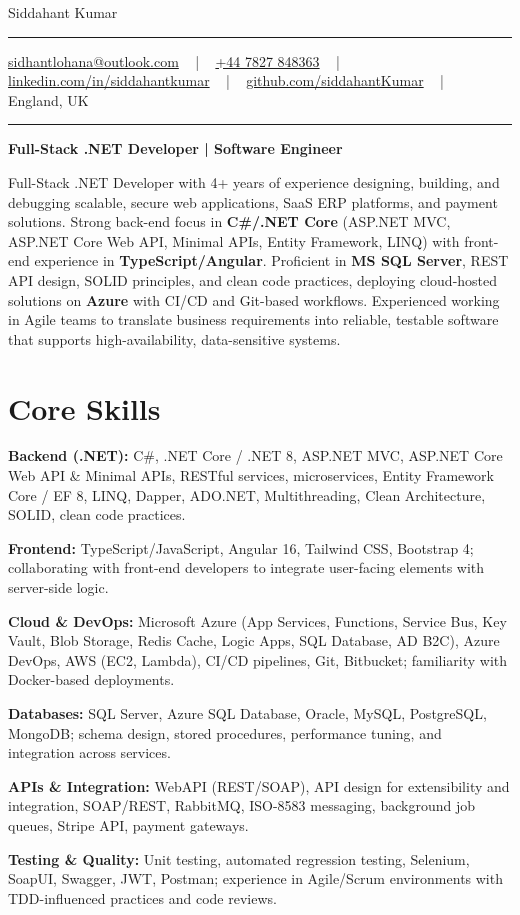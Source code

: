 \documentclass[letterpaper,10pt]{article}
\newcommand{\documentTitle}[2]{
  \begin{center}
    \vspace*{-0.3in}
    {\Huge\color{accentTitle} #1}
    \vspace{8pt}
    {\color{accentLine} \hrule}
    \vspace{2pt}
    \footnotesize{#2}
    \vspace{2pt}
    {\color{accentLine} \hrule}
  \end{center}
}
\newenvironment{resume_list}{
  \vspace{-7pt}
  \begin{itemize}[itemsep=-2px, parsep=1pt, leftmargin=30pt]
}{
  \end{itemize}
}
\begin{document}
\documentTitle{Siddahant Kumar}{
\vspace{0.1cm}
\href{mailto:sidhantlohana@outlook.com}{sidhantlohana@outlook.com} ~ | ~
\href{tel:+447827848363}{+44 7827 848363} ~ | ~
\href{https://www.linkedin.com/in/siddahantkumar/}{linkedin.com/in/siddahantkumar} ~ | ~
\href{https://github.com/siddahantKumar}{github.com/siddahantKumar} ~ | ~
England, UK
}

\begin{center}
\textbf{Full-Stack .NET Developer | Software Engineer}
\end{center}

Full-Stack .NET Developer with 4+ years of experience designing, building, and debugging scalable, secure web applications, SaaS ERP platforms, and payment solutions. Strong back-end focus in \textbf{C\#/.NET Core} (ASP.NET MVC, ASP.NET Core Web API, Minimal APIs, Entity Framework, LINQ) with front-end experience in \textbf{TypeScript/Angular}. Proficient in \textbf{MS SQL Server}, REST API design, SOLID principles, and clean code practices, deploying cloud-hosted solutions on \textbf{Azure} with CI/CD and Git-based workflows. Experienced working in Agile teams to translate business requirements into reliable, testable software that supports high-availability, data-sensitive systems.


\section{Core Skills}

\begin{resume_list}
    \item \textbf{Backend (.NET):} C\#, .NET Core / .NET 8, ASP.NET MVC, ASP.NET Core Web API \& Minimal APIs, RESTful services, microservices, Entity Framework Core / EF 8, LINQ, Dapper, ADO.NET, Multithreading, Clean Architecture, SOLID, clean code practices.
    \item \textbf{Frontend:} TypeScript/JavaScript, Angular 16, Tailwind CSS, Bootstrap 4; collaborating with front-end developers to integrate user-facing elements with server-side logic.
    \item \textbf{Cloud \& DevOps:} Microsoft Azure (App Services, Functions, Service Bus, Key Vault, Blob Storage, Redis Cache, Logic Apps, SQL Database, AD B2C), Azure DevOps, AWS (EC2, Lambda), CI/CD pipelines, Git, Bitbucket; familiarity with Docker-based deployments.
    \item \textbf{Databases:} SQL Server, Azure SQL Database, Oracle, MySQL, PostgreSQL, MongoDB; schema design, stored procedures, performance tuning, and integration across services.
    \item \textbf{APIs \& Integration:} WebAPI (REST/SOAP), API design for extensibility and integration, SOAP/REST, RabbitMQ, ISO-8583 messaging, background job queues, Stripe API, payment gateways.
    \item \textbf{Testing \& Quality:} Unit testing, automated regression testing, Selenium, SoapUI, Swagger, JWT, Postman; experience in Agile/Scrum environments with TDD-influenced practices and code reviews.
\end{resume_list}
\end{document}
